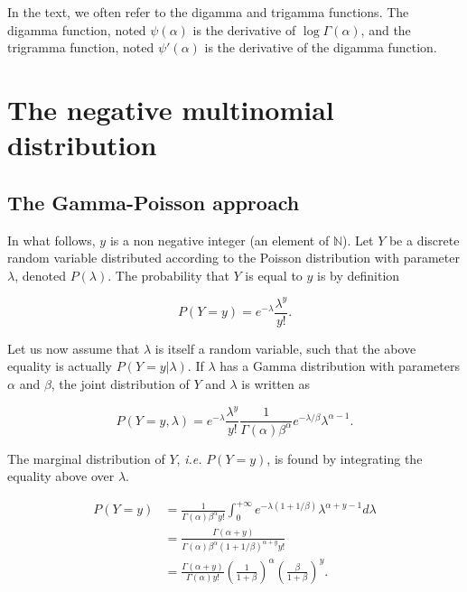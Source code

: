 \documentclass[12pt]{article}
\begin{document}
{}





\newpage
\begin{appendices}



In the text, we often refer to the digamma and trigamma
functions. The digamma function, noted $\psi(\alpha)$ is the
derivative of $\log \Gamma(\alpha)$, and the trigramma function,
noted $\psi'(\alpha)$ is the derivative of the digamma function.
  

\section{The negative multinomial distribution}
\label{nb}

\subsection{The Gamma-Poisson approach}
\label{subsection_gamma_poisson}

    In what follows, $y$ is a non negative integer (an element of
    $\mathbb{N}$). Let $Y$ be a
    discrete random variable distributed according to the Poisson
    distribution with parameter $\lambda$, denoted $P(\lambda)$.
    The probability that $Y$ is equal to $y$ is by definition

    $$ P(Y=y) = e^{-\lambda} \frac{\lambda^y}{y!}. $$

    Let us now assume that $\lambda$ is itself a random variable,
    such that the above equality is actually $P(Y=y | \lambda)$.
    If $\lambda$ has a Gamma distribution with parameters $\alpha$
    and $\beta$, the joint distribution of $Y$ and $\lambda$ is
    written as

    $$ P(Y=y, \lambda) = e^{-\lambda} \frac{\lambda^y}{y!}
         \frac{1}{\Gamma(\alpha)\beta^{\alpha}} e^{-\lambda/\beta}
         \lambda^{\alpha-1}. $$

    The marginal distribution of $Y$, \textit{i.e.} $P(Y=y)$, is found
    by integrating the equality above over $\lambda$.

    \begin{align}
      P(Y=y) &= \frac{1}{\Gamma(\alpha)\beta^{\alpha}y!}
         \int_0^{+\infty} e^{-\lambda(1+1/\beta)} \lambda^{\alpha+y-1}
         d\lambda \nonumber \\
        &= \frac{\Gamma(\alpha+y)}{\Gamma(\alpha)\beta^{\alpha}
          (1+1/\beta)^{\alpha+y} y!} \nonumber \\
        &= \frac{\Gamma(\alpha+y)}{\Gamma(\alpha)y!}
          \left(\frac{1}{1+\beta}\right)^{\alpha}
          \left(\frac{\beta}{1+\beta}\right)^y.
\label{NBdistrib}
    \end{align}


\end{appendices}
\end{document}
